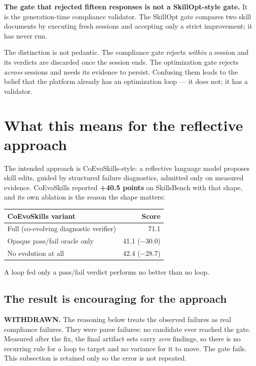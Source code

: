 \documentclass[11pt,a4paper]{article}
\begin{document}
\textbf{The gate that rejected fifteen responses is not a SkillOpt-style gate.} It
is the generation-time compliance validator. The SkillOpt gate compares two skill
documents by executing fresh sessions and accepting only a strict improvement; it
has never run.

The distinction is not pedantic. The compliance gate rejects \emph{within} a
session and its verdicts are discarded once the session ends. The optimization
gate rejects \emph{across} sessions and needs its evidence to persist. Confusing
them leads to the belief that the platform already has an optimization loop ---
it does not; it has a validator.

\section{What this means for the reflective approach}

The intended approach is CoEvoSkills-style: a reflective language model proposes
skill edits, guided by structured failure diagnostics, admitted only on measured
evidence. CoEvoSkills reported \textbf{+40.5 points} on SkillsBench with that
shape, and its own ablation is the reason the shape matters:

\begin{center}
\begin{tabular}{@{}lr@{}}
\toprule
\textbf{CoEvoSkills variant} & \textbf{Score} \\
\midrule
Full (co-evolving diagnostic verifier) & 71.1 \\
Opaque pass/fail oracle only & 41.1 \quad ($-30.0$) \\
No evolution at all & 42.4 \quad ($-28.7$) \\
\bottomrule
\end{tabular}
\end{center}

A loop fed only a pass/fail verdict performs no better than no loop.

\subsection{The result is encouraging for the approach}
\label{sec:encouraging}

\begin{notebox}[colframe=warn]
\textbf{WITHDRAWN.} The reasoning below treats the observed failures as real
compliance failures. They were parse failures: no candidate ever reached the gate.
Measured after the fix, the final artifact sets carry \emph{zero} findings, so there
is no recurring rule for a loop to target and no variance for it to move. The gate
fails. This subsection is retained only so the error is not repeated.
\end{notebox}
\end{document}
